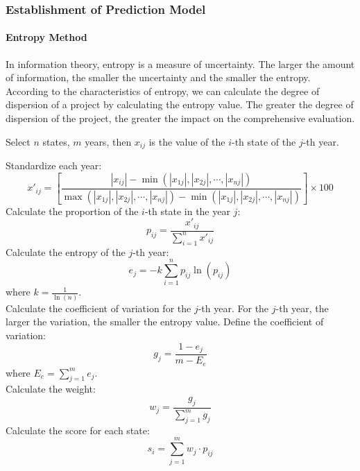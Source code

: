 \documentclass[12pt]{mcmthesis}
\begin{document}
\subsubsection{Establishment of Prediction Model}
\paragraph{Entropy Method}
In information theory, entropy is a measure of uncertainty\cite{weight}. The larger the amount of information, the smaller the uncertainty and the smaller the entropy. According to the characteristics of entropy, we can calculate the degree of dispersion of a project by calculating the entropy value. The greater the degree of dispersion of the project, the greater the impact on the comprehensive evaluation.\par
Select $n$ states, $m$ years, then $x_{ij}$ is the value of the $i$-th state of the $j$-th year.\par
Standardize each year:
\begin{equation}
 x'_{ij}=\left[\frac{\left|x_{ij}\right|-\min\left(\left|x_{1j}\right|,\left|x_{2j}\right|,\dotsm,\left|x_{nj}\right|\right)}{\max\left(\left|x_{1j}\right|,\left|x_{2j}\right|,\dotsm,\left|x_{nj}\right|\right)-\min\left(\left|x_{1j}\right|,\left|x_{2j}\right|,\dotsm,\left|x_{nj}\right|\right)}\right]\times 100
\end{equation}\label{shangzhi}
Calculate the proportion of the $i$-th state in the year $j$:
\begin{equation}
p_{ij}=\frac{x'_{ij}}{\sum_{i=1}^n x'_{ij}}
\end{equation}
Calculate the entropy of the $j$-th year:
\begin{equation}
e_j=-k\sum_{i=1}^{n}p_{ij}\ln\left(p_{ij}\right)
\end{equation}
where
$k=\frac{1}{\ln\left(n\right)}$.\\
Calculate the coefficient of variation for the $j$-th year. For the $j$-th year, the larger the variation, the smaller the entropy value. Define the coefficient of variation:
\begin{equation}
g_j=\frac{1-e_j}{m-E_e}
\end{equation}
where
$E_e=\sum_{j=1}^{m}e_j$.\\
Calculate the weight:
\begin{equation}
w_j=\frac{g_j}{\sum_{j=1}^{m}g_j}
\end{equation}
Calculate the score for each state:
\begin{equation}
s_i=\sum_{j=1}^{m}w_j\cdot  p_{ij}
\end{equation}
\end{document}
